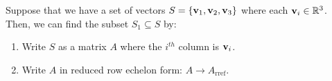 \begin{example}
	Suppose that we have a set of vectors $S=\{{\bf v}_1, {\bf v}_2, {\bf v}_3 \}$ where each ${\bf v}_i\in\mathbb{R}^3$. Then, we can find the subset $S_1\subseteq S$ by:
	\begin{enumerate}[label=(\roman*)]
		\item Write $S$ as a matrix $A$ where the $i^{th}$ column is ${\bf v}_i$.
		\item Write $A$ in reduced row echelon form: $A\to A_\mathrm{rref}$.
	\end{enumerate} 
\end{example} 

